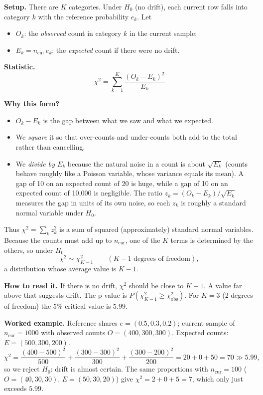 \documentclass[11pt]{article}
\begin{document}
\textbf{Setup.} There are \(K\) categories. Under \(H_0\) (no drift), each current row falls into category \(k\) with the reference probability \(e_k\). Let
\begin{itemize}
    \item \(O_k\): the \emph{observed} count in category \(k\) in the current sample;
    \item \(E_k=n_{\text{cur}}\,e_k\): the \emph{expected} count if there were no drift.
\end{itemize}

\textbf{Statistic.}
\[
\boxed{
\chi^2=\sum_{k=1}^{K}\frac{(O_k-E_k)^2}{E_k}
}
\]

\textbf{Why this form?}
\begin{itemize}
    \item \(O_k-E_k\) is the gap between what we saw and what we expected.
    \item We \emph{square} it so that over-counts and under-counts both add to the total rather than cancelling.
    \item We \emph{divide by \(E_k\)} because the natural noise in a count is about \(\sqrt{E_k}\) (counts behave roughly like a Poisson variable, whose variance equals its mean). A gap of 10 on an expected count of 20 is huge, while a gap of 10 on an expected count of 10{,}000 is negligible. The ratio \(z_k=(O_k-E_k)/\sqrt{E_k}\) measures the gap in units of its own noise, so each \(z_k\) is roughly a standard normal variable under \(H_0\).
\end{itemize}
Thus \(\chi^2=\sum_kz_k^2\) is a sum of squared (approximately) standard normal variables. Because the counts must add up to \(n_{\text{cur}}\), one of the \(K\) terms is determined by the others, so under \(H_0\)
\[
\chi^2\sim\chi^2_{K-1}\qquad(K-1\text{ degrees of freedom}),
\]
a distribution whose average value is \(K-1\).

\textbf{How to read it.} If there is no drift, \(\chi^2\) should be close to \(K-1\). A value far above that suggests drift. The p-value is \(P(\chi^2_{K-1}\ge\chi^2_{\text{obs}})\). For \(K=3\) (2 degrees of freedom) the \(5\%\) critical value is \(5.99\).

\textbf{Worked example.} Reference shares \(e=(0.5,0.3,0.2)\); current sample of \(n_{\text{cur}}=1000\) with observed counts \(O=(400,300,300)\). Expected counts: \(E=(500,300,200)\).
\[
\chi^2=\frac{(400-500)^2}{500}+\frac{(300-300)^2}{300}+\frac{(300-200)^2}{200}=20+0+50=70\gg5.99,
\]
so we reject \(H_0\): drift is almost certain. The same proportions with \(n_{\text{cur}}=100\) (\(O=(40,30,30)\), \(E=(50,30,20)\)) give \(\chi^2=2+0+5=7\), which only just exceeds \(5.99\).
\end{document}
